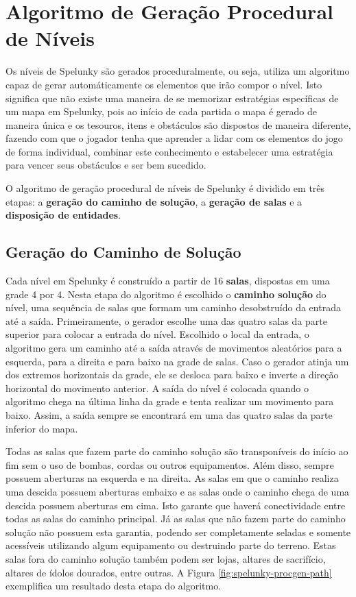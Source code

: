 \section{\label{section:spelunky-procgen}Algoritmo de Geração Procedural de
Níveis}
Os níveis de Spelunky são gerados proceduralmente, ou seja, utiliza
um algoritmo capaz de gerar automáticamente os elementos que irão compor o
nível. Isto significa que não existe uma maneira de se memorizar estratégias
específicas de um mapa em Spelunky, pois ao início de cada partida o mapa é
gerado de maneira única e os tesouros, itens e obstáculos são dispostos de
maneira diferente, fazendo com que o jogador tenha que aprender a lidar com os
elementos do jogo de forma individual, combinar este conhecimento e estabelecer
uma estratégia para vencer seus obstáculos e ser bem sucedido.

O algoritmo de geração procedural de níveis de Spelunky é dividido em três
etapas: a \textbf{geração do caminho de solução}, a \textbf{geração de salas} e
a \textbf{disposição de entidades}.

\subsection{\label{section:spelunky-procgen-path}Geração do Caminho de Solução}
Cada nível em Spelunky é construído a partir de 16 \textbf{salas}, dispostas em
uma grade 4 por 4. Nesta etapa do algoritmo é escolhido o \textbf{caminho
solução} do nível, uma sequência de salas que formam um caminho desobstruído da
entrada até a saída. Primeiramente, o gerador escolhe uma das quatro salas da
parte superior para colocar a entrada do nível. Escolhido o local da entrada, o
algoritmo gera um caminho até a saída através de movimentos aleatórios para a
esquerda, para a direita e para baixo na grade de salas. Caso o gerador atinja
um dos extremos horizontais da grade, ele se desloca para baixo e inverte a
direção horizontal do movimento anterior. A saída do nível é colocada quando o
algoritmo chega na última linha da grade e tenta realizar um movimento para
baixo. Assim, a saída sempre se encontrará em uma das quatro salas da parte
inferior do mapa.

Todas as salas que fazem parte do caminho solução são transponíveis do início ao
fim sem o uso de bombas, cordas ou outros equipamentos. Além disso, sempre
possuem aberturas na esquerda e na direita. As salas em que o caminho realiza
uma descida possuem aberturas embaixo e as salas onde o caminho chega de uma
descida possuem aberturas em cima. Isto garante que haverá conectividade entre
todas as salas do caminho principal. Já as salas que não fazem parte do caminho
solução não possuem esta garantia, podendo ser completamente seladas e somente
acessíveis utilizando algum equipamento ou destruindo parte do terreno. Estas
salas fora do caminho solução também podem ser lojas, altares de sacrifício,
altares de ídolos dourados, entre outras. A Figura
\ref{fig:spelunky-procgen-path} exemplifica um resultado desta etapa do
algoritmo.

